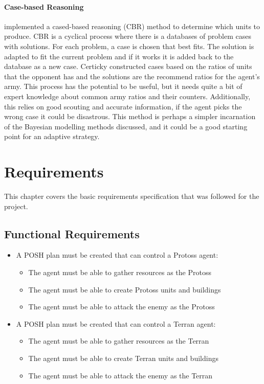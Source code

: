 \documentclass[11pt,openright,a4paper]{report}
\begin{document}
\subsubsection{Case-based Reasoning}
 implemented a cased-based reasoning (CBR) method to determine which units to produce. CBR is a cyclical process where there is a databases of problem cases with solutions. For each problem, a case is chosen that best fits. The solution is adapted to fit the current problem and if it works it is added back to the database as a new case. Certicky constructed cases based on the ratios of units that the opponent has and the solutions are the recommend ratios for the agent's army. This process has the potential to be useful, but it needs quite a bit of expert knowledge about common army ratios and their counters. Additionally, this relies on good scouting and accurate information, if the agent picks the wrong case it could be disastrous. This method is perhaps a simpler incarnation of the Bayesian modelling methods discussed, and it could be a good starting point for an adaptive strategy.

\chapter{Requirements}
This chapter covers the basic requirements specification that was followed for the project.

\section{Functional Requirements}
\begin{itemize}
\item A POSH plan must be created that can control a Protoss agent:
    \begin{itemize}
    \item{The agent must be able to gather resources as the Protoss}
    \item{The agent must be able to create Protoss units and buildings}
    \item{The agent must be able to attack the enemy as the Protoss}
    \end{itemize}
\item A POSH plan must be created that can control a Terran agent:
    \begin{itemize}
    \item{The agent must be able to gather resources as the Terran}
    \item{The agent must be able to create Terran units and buildings}
    \item{The agent must be able to attack the enemy as the Terran}
    \end{itemize}
\end{itemize}
\end{document}
